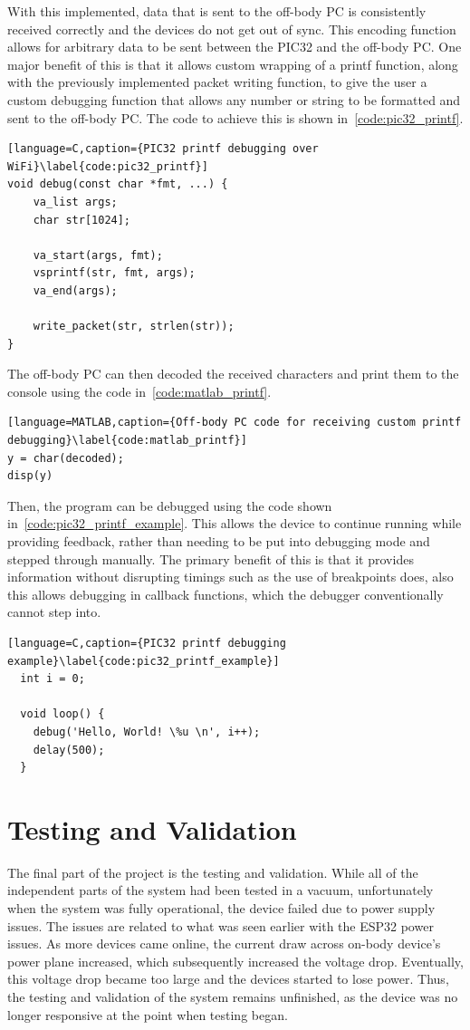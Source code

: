 With this implemented, data that is sent to the off-body PC is consistently received correctly and the devices do not get out of sync.
This encoding function allows for arbitrary data to be sent between the PIC32 and the off-body PC.
One major benefit of this is that it allows custom wrapping of a printf function, along with the previously implemented packet writing function,
to give the user a custom debugging function that allows any number or string to be formatted and sent to the off-body PC.
The code to achieve this is shown in~\autoref{code:pic32_printf}.

\begin{lstlisting}[language=C,caption={PIC32 printf debugging over WiFi}\label{code:pic32_printf}]
void debug(const char *fmt, ...) {
    va_list args;
    char str[1024];

    va_start(args, fmt);
    vsprintf(str, fmt, args);
    va_end(args);

    write_packet(str, strlen(str));
}
\end{lstlisting}

The off-body PC can then decoded the received characters and print them to the console using the code in~\autoref{code:matlab_printf}.

\begin{lstlisting}[language=MATLAB,caption={Off-body PC code for receiving custom printf debugging}\label{code:matlab_printf}]
y = char(decoded);
disp(y)
\end{lstlisting}

Then, the program can be debugged using the code shown in~\autoref{code:pic32_printf_example}.
This allows the device to continue running while providing feedback, rather than needing to be put into debugging mode and stepped through manually.
The primary benefit of this is that it provides information without disrupting timings such as the use of breakpoints does, also this allows debugging in callback functions,
which the debugger conventionally cannot step into.

\begin{lstlisting}[language=C,caption={PIC32 printf debugging example}\label{code:pic32_printf_example}]
  int i = 0;

  void loop() {
    debug('Hello, World! \%u \n', i++);
    delay(500);
  }
\end{lstlisting}


\section{Testing and Validation}
The final part of the project is the testing and validation.
While all of the independent parts of the system had been tested in a vacuum,
unfortunately when the system was fully operational, the device failed due to power supply issues.
The issues are related to what was seen earlier with the ESP32 power issues.
As more devices came online, the current draw across on-body device's power plane increased, which subsequently increased the voltage drop.
Eventually, this voltage drop became too large and the devices started to lose power.
Thus, the testing and validation of the system remains unfinished, as the device was no longer responsive at the point when testing began.
